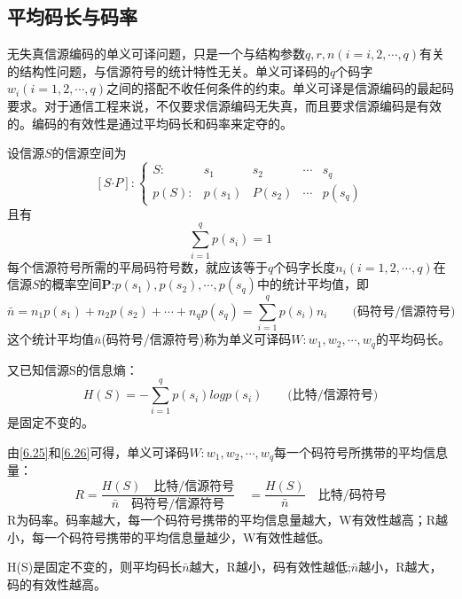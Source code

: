 \documentclass[UTF8]{ctexart}
\theoremstyle{plain}
\theoremstyle{definition}
\theoremstyle{remark}
\begin{document}
\subsection{平均码长与码率}
无失真信源编码的单义可译问题，只是一个与结构参数$q,r,n(i=i,2,\cdots,q)$有关的结构性问题，与信源符号的统计特性无关。单义可译码的$q$个码字$w_i(i=1,2,\cdots,q)$之间的搭配不收任何条件的约束。单义可译是信源编码的最起码要求。对于通信工程来说，不仅要求信源编码无失真，而且要求信源编码是有效的。编码的有效性是通过平均码长和码率来定夺的。

设信源$S$的信源空间为
\begin{equation*}
	\label{sourcespace}
	\left[S \bm{\cdot} P\right]:
		\left\{ 
			\begin{array}{ccccc}
			S: & s_{1} & s_{2} & \cdots & s_{q}\\
			p(S): & p(s_{1}) & P(s_{2}) & \cdots & p(s_{q})
			\end{array}
		\right.
\end{equation*}
且有
\begin{equation}
\label{6.24}
\sum\limits_{i=1}^{q}p(s_i)=1
\end{equation}
每个信源符号所需的平局码符号数，就应该等于$q$个码字长度$n_i(i=1,2,\cdots,q)$在信源$S$的概率空间$\textbf{P:}{p(s_1),p(s_2),\cdots,p(s_q)}$中的统计平均值，即
\begin{equation}
\label{6.25}
\bar{n}=n_1p(s_1)+n_2p(s_2)+\cdots+n_qp(s_q)=\sum\limits_{i=1}^{q}p(s_i)n_i \qquad \text{(码符号/信源符号)}
\end{equation}
这个统计平均值$\bar{n}$(码符号/信源符号)称为单义可译码$W:{w_1,w_2,\cdots,w_q}$的平均码长。

又已知信源S的信息熵：
\begin{equation}
\label{6.26}
H(S)=-\sum\limits_{i=1}^{q}p(s_i)logp(s_i) \qquad \text{(比特/信源符号)}
\end{equation}
是固定不变的。

由\cref{6.25}和\cref{6.26}可得，单义可译码$W:{w_1,w_2,\cdots,w_q}$每一个码符号所携带的平均信息量：
\begin{equation}
\label{6.27}
R=\dfrac{H(S)\quad \text{比特/信源符号}}{\bar{n}\quad \text{码符号/信源符号}}\quad=\dfrac{H(S)}{\bar{n}} \quad \text{比特/码符号}
\end{equation}
R为码率。码率越大，每一个码符号携带的平均信息量越大，W有效性越高；R越小，每一个码符号携带的平均信息量越少，W有效性越低。

H(S)是固定不变的，则平均码长$\bar{n}$越大，R越小，码有效性越低;$\bar{n}$越小，R越大，码的有效性越高。
\end{document}
